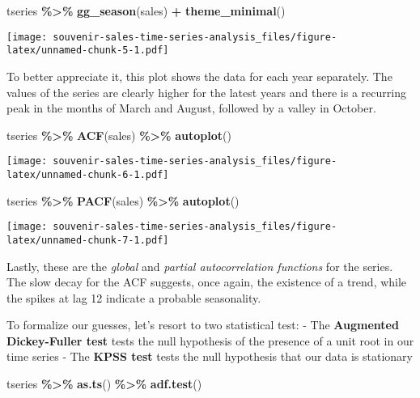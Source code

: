 \documentclass[
]{article}
\newenvironment{Shaded}{\begin{snugshade}}{\end{snugshade}}
\newcommand{\FunctionTok}[1]{\textcolor[rgb]{0.13,0.29,0.53}{\textbf{#1}}}
\newcommand{\NormalTok}[1]{#1}
\newcommand{\SpecialCharTok}[1]{\textcolor[rgb]{0.81,0.36,0.00}{\textbf{#1}}}
\begin{document}
\begin{Shaded}
\begin{Highlighting}[]
\NormalTok{tseries }\SpecialCharTok{\%\textgreater{}\%} \FunctionTok{gg\_season}\NormalTok{(sales) }\SpecialCharTok{+}
  \FunctionTok{theme\_minimal}\NormalTok{()}
\end{Highlighting}
\end{Shaded}

\texttt{[image: souvenir-sales-time-series-analysis\_files/figure-latex/unnamed-chunk-5-1.pdf]}

To better appreciate it, this plot shows the data for each year
separately. The values of the series are clearly higher for the latest
years and there is a recurring peak in the months of March and August,
followed by a valley in October.

\begin{Shaded}
\begin{Highlighting}[]
\NormalTok{tseries }\SpecialCharTok{\%\textgreater{}\%} \FunctionTok{ACF}\NormalTok{(sales) }\SpecialCharTok{\%\textgreater{}\%} \FunctionTok{autoplot}\NormalTok{()}
\end{Highlighting}
\end{Shaded}

\texttt{[image: souvenir-sales-time-series-analysis\_files/figure-latex/unnamed-chunk-6-1.pdf]}

\begin{Shaded}
\begin{Highlighting}[]
\NormalTok{tseries }\SpecialCharTok{\%\textgreater{}\%} \FunctionTok{PACF}\NormalTok{(sales) }\SpecialCharTok{\%\textgreater{}\%} \FunctionTok{autoplot}\NormalTok{()}
\end{Highlighting}
\end{Shaded}

\texttt{[image: souvenir-sales-time-series-analysis\_files/figure-latex/unnamed-chunk-7-1.pdf]}

Lastly, these are the \emph{global} and \emph{partial autocorrelation
functions} for the series. The slow decay for the ACF suggests, once
again, the existence of a trend, while the spikes at lag 12 indicate a
probable seasonality.

To formalize our guesses, let's resort to two statistical test: - The
\textbf{Augmented Dickey-Fuller test} tests the null hypothesis of the
presence of a unit root in our time series - The \textbf{KPSS test}
tests the null hypothesis that our data is stationary

\begin{Shaded}
\begin{Highlighting}[]
\NormalTok{tseries }\SpecialCharTok{\%\textgreater{}\%} \FunctionTok{as.ts}\NormalTok{() }\SpecialCharTok{\%\textgreater{}\%} \FunctionTok{adf.test}\NormalTok{()}
\end{Highlighting}
\end{Shaded}
\end{document}
